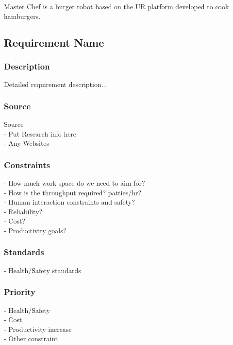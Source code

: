Master Chef is a burger robot based on the UR platform developed to cook hamburgers.

\subsection{Requirement Name}
\subsubsection{Description}
Detailed requirement description...
\subsubsection{Source}
Source \\
- Put Research info here\\
- Any Websites
\subsubsection{Constraints}
- How much work space do we need to aim for?\\
- How is the throughput required? patties/hr?\\
- Human interaction constraints and safety?\\
- Reliability? \\
- Cost? \\
- Productivity goals?
\subsubsection{Standards}
- Health/Safety standards\\
\subsubsection{Priority}
- Health/Safety\\
- Cost\\
- Productivity increase \\
- Other constraint\\